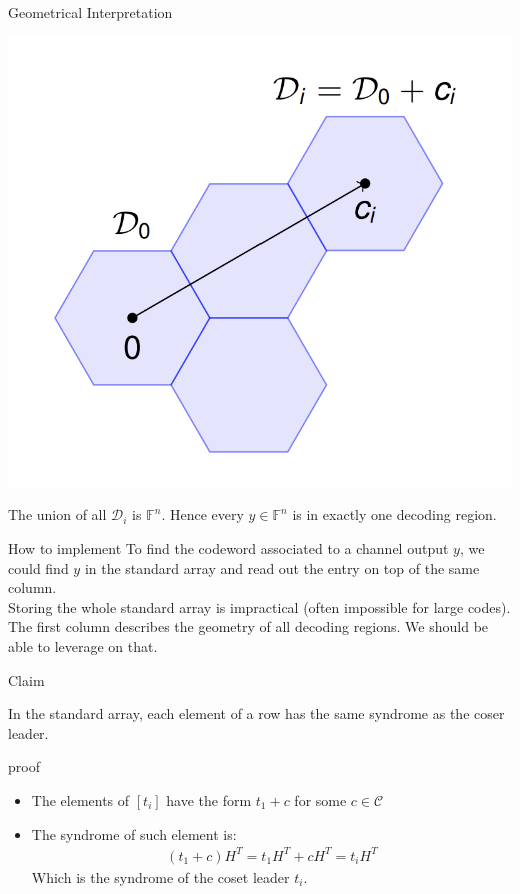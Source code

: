 \begin{parag}{Geometrical Interpretation}
    \begin{center}
        \includegraphics[scale=0.5]{12025-05-20.png}
    \end{center}
    The union of all $\mathcal{D}_i$ is $\mathbb{F}^n$. Hence every $y \in \mathbb{F}^n$ is in exactly one decoding region.
\end{parag}
\begin{parag}{How to implement}
    To find the codeword associated to a channel output $y$, we could find $y$ in the standard array and read out the entry on top of the same column.\\
    Storing the whole standard array is impractical (often impossible for large codes).\\
    The first column describes the geometry of all decoding regions. We should be able to leverage on that.
\end{parag}
\begin{parag}{Claim}
    \begin{theoreme}
    In the standard array, each element of a row has the same syndrome as the coser leader.
    \end{theoreme}
    \begin{subparag}{proof}
        \begin{itemize}
		\item The elements of $\left[t_i\right]$ have the form $t_1 + c$ for some $c \in \mathcal{C}$
		\item The syndrome of such element is:
			\begin{align*} 
				(t_1 + c)H^T =  t_1H^T + cH^T =  t_iH^T
			\end{align*}
			Which is the syndrome of the coset leader $t_i$.
        \end{itemize}
    \end{subparag}
\end{parag}
